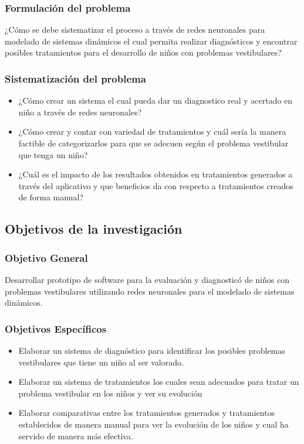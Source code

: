     \subsubsection{Formulación del problema}
    ¿Cómo se debe sistematizar el proceso a través de redes neuronales para modelado de sistemas dinámicos el cual permita realizar diagnósticos y encontrar posibles tratamientos para el desarrollo de niños con problemas vestibulares?
    \subsubsection{Sistematización del problema}
    \begin{itemize}
    \item ¿Cómo crear un sistema el cual pueda dar un diagnostico real y acertado en niño a través de redes neuronales?
    \item ¿Cómo crear y contar con variedad de tratamientos y cuál sería la manera factible de categorizarlos para que se adecuen según el problema vestibular que tenga un niño?
    \item ¿Cuál es el impacto de los resultados obtenidos en tratamientos generados a través del aplicativo y que beneficios da con respecto a tratamientos creados de forma manual? 
    \end{itemize}
    \subsection{Objetivos de la investigación}
    \subsubsection{Objetivo General}
    Desarrollar prototipo de software para la evaluación y diagnosticó de niños con problemas vestibulares utilizando redes neuronales para el modelado de sistemas dinámicos.
    \subsubsection{Objetivos Específicos}
    \begin{itemize}
    \item Elaborar un sistema de diagnóstico para identificar los posibles problemas vestibulares que tiene un niño al ser valorado.
    \item Elaborar un sistema de tratamientos los cuales sean adecuados para tratar un problema vestibular en los niños y ver su evolución
    \item Elaborar comparativas entre los tratamientos generados y tratamientos establecidos de manera manual para ver la evolución de los niños y cual ha servido de manera más efectiva.
    \end{itemize}
